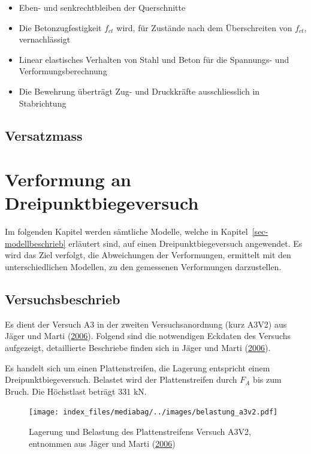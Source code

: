 \documentclass[
  letterpaper,
]{scrreprt}
\providecommand{\tightlist}{%
  \setlength{\itemsep}{0pt}\setlength{\parskip}{0pt}}\usepackage{longtable,booktabs,array}
\begin{document}
\begin{itemize}
\tightlist
\item
  Eben- und senkrechtbleiben der Querschnitte
\item
  Die Betonzugfestigkeit \(f_{ct}\) wird, für Zustände nach dem
  Überschreiten von \(f_{ct}\), vernachlässigt
\item
  Linear elastisches Verhalten von Stahl und Beton für die Spannungs-
  und Verformungsberechnung
\item
  Die Bewehrung überträgt Zug- und Druckkräfte ausschliesslich in
  Stabrichtung
\end{itemize}

\hypertarget{versatzmass}{%
\section{Versatzmass}\label{versatzmass}}


\hypertarget{verformung-an-dreipunktbiegeversuch}{%
\chapter{Verformung an
Dreipunktbiegeversuch}\label{verformung-an-dreipunktbiegeversuch}}

Im folgenden Kapitel werden sämtliche Modelle, welche in
Kapitel~\ref{sec-modellbeschrieb} erläutert sind, auf einen
Dreipunktbiegeversuch angewendet. Es wird das Ziel verfolgt, die
Abweichungen der Verformungen, ermittelt mit den unterschiedlichen
Modellen, zu den gemessenen Verformungen darzustellen.

\hypertarget{versuchsbeschrieb}{%
\section{Versuchsbeschrieb}\label{versuchsbeschrieb}}

Es dient der Versuch A3 in der zweiten Versuchsanordnung (kurz A3V2) aus
Jäger und Marti (\protect\hyperlink{ref-Jaeger2006}{2006}). Folgend sind
die notwendigen Eckdaten des Versuchs aufgezeigt, detaillierte
Beschriebe finden sich in Jäger und Marti
(\protect\hyperlink{ref-Jaeger2006}{2006}).

Es handelt sich um einen Plattenstreifen, die Lagerung entspricht einem
Dreipunktbiegeversuch. Belastet wird der Plattenstreifen durch \(F_A\)
bis zum Bruch. Die Höchstlast beträgt \(331 \text{ kN}\).

\begin{figure}[H]

{\centering \texttt{[image: index\_files/mediabag/../images/belastung\_a3v2.pdf]}

}

\caption{Lagerung und Belastung des Plattenstreifens Versuch A3V2,
entnommen aus Jäger und Marti
(\protect\hyperlink{ref-Jaeger2006}{2006})}

\end{figure}
\end{document}
